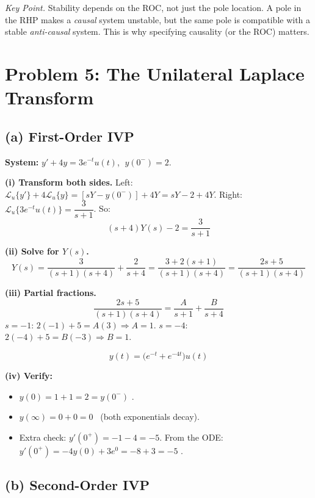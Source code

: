 \documentclass[11pt]{article}
\begin{document}
\medskip
\noindent\textit{Key Point.} Stability depends on the ROC, not just the pole location. A pole in
the RHP makes a \emph{causal} system unstable, but the same pole is compatible with a stable
\emph{anti-causal} system. This is why specifying causality (or the ROC) matters.

\section*{Problem 5: The Unilateral Laplace Transform}

\subsection*{(a) First-Order IVP}

\textbf{System:} $y' + 4y = 3e^{-t}u(t)$, $\;y(0^-) = 2$.

\textbf{(i) Transform both sides.}
Left: $\mathcal{L}_u\{y'\} + 4\mathcal{L}_u\{y\} = [sY - y(0^-)] + 4Y = sY - 2 + 4Y$.
Right: $\mathcal{L}_u\{3e^{-t}u(t)\} = \dfrac{3}{s+1}$.
So:
\[
(s+4)Y(s) - 2 = \frac{3}{s+1}
\]

\textbf{(ii) Solve for $Y(s)$.}
\[
Y(s) = \frac{3}{(s+1)(s+4)} + \frac{2}{s+4}
= \frac{3 + 2(s+1)}{(s+1)(s+4)}
= \frac{2s+5}{(s+1)(s+4)}
\]

\textbf{(iii) Partial fractions.}
\[
\frac{2s+5}{(s+1)(s+4)} = \frac{A}{s+1} + \frac{B}{s+4}
\]
$s=-1$: $2(-1)+5 = A(3) \Rightarrow A = 1$. \quad $s=-4$: $2(-4)+5 = B(-3) \Rightarrow B = 1$.

\begin{equation*}
\boxed{y(t) = \bigl(e^{-t} + e^{-4t}\bigr)u(t)}
\end{equation*}

\textbf{(iv) Verify:}
\begin{itemize}[leftmargin=2em]
\item $y(0) = 1 + 1 = 2 = y(0^-)$ \checkmark.
\item $y(\infty) = 0 + 0 = 0$ \checkmark\ (both exponentials decay).
\item Extra check: $y'(0^+) = -1 - 4 = -5$. From the ODE: $y'(0^+) = -4y(0) + 3e^0 = -8+3 = -5$ \checkmark.
\end{itemize}

\subsection*{(b) Second-Order IVP}
\end{document}
